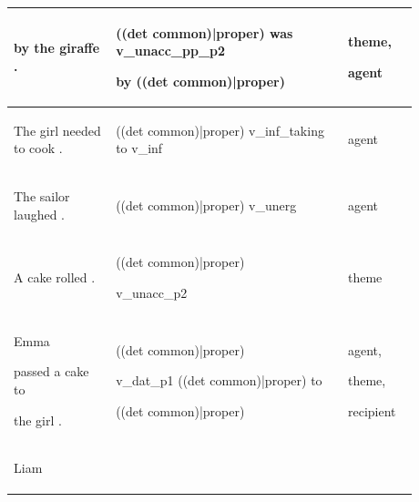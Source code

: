 \documentclass[11pt]{article}
\begin{document}
\begin{table}
\begin{tabular}{p{0.225\linewidth} p{0.50\linewidth} p{0.15\linewidth}}
\begin{tiny}
by the giraffe .\end{tiny} & \begin{tiny}((det common)|proper) was v\_unacc\_pp\_p2 

by ((det common)|proper)\end{tiny} & \begin{tiny}theme,

agent\end{tiny} \\
\hline
\begin{tiny}The girl needed to cook .\end{tiny} & \begin{tiny}((det common)|proper) v\_inf\_taking to v\_inf\end{tiny} & \begin{tiny}agent\end{tiny} \\
\hline
\begin{tiny}The sailor laughed .\end{tiny} & \begin{tiny}((det common)|proper) v\_unerg\end{tiny} & \begin{tiny}agent\end{tiny} \\
\hline
\begin{tiny}A cake rolled .\end{tiny} & \begin{tiny}((det common)|proper)

v\_unacc\_p2\end{tiny} & \begin{tiny}theme\end{tiny} \\
\hline
\begin{tiny}Emma 

passed a cake to 

the girl .\end{tiny} & \begin{tiny}((det common)|proper)

v\_dat\_p1 ((det common)|proper) to 

((det common)|proper)\end{tiny} & \begin{tiny}agent,

theme,

recipient\end{tiny} \\
\hline
\begin{tiny}Liam 


\end{tiny}
\end{tabular}
\end{table}
\end{document}
